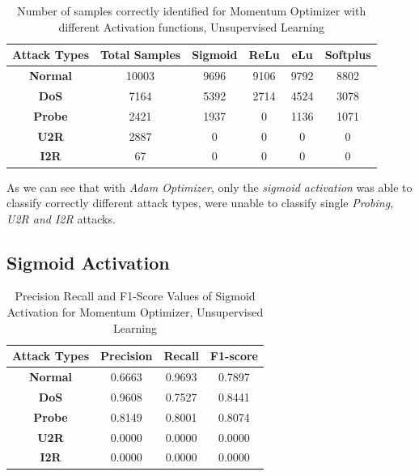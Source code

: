 \documentclass[12pt, a4paper]{report}
\begin{document}
\begin{appendices}
	\begin{table}[ht]
	\centering
	\captionsetup{justification=centering,margin=2cm}
	\begin{tabular}{|c|c|c|c|c|c|}
	\hline
	\textbf{Attack Types} & \textbf{Total Samples} & \textbf{Sigmoid} & \textbf{ReLu} & \textbf{eLu} & \textbf{Softplus} \\ \hline
	\textbf{Normal}       & 10003                  & 9696            & 9106         & 9792        & 8802           \\ \hline
	\textbf{DoS}          & 7164                  & 5392            & 2714         & 4524        & 3078             \\ \hline
	\textbf{Probe}        & 2421                  & 1937             & 0          & 1136         & 1071              \\ \hline
	\textbf{U2R}          & 2887                    & 0             & 0           & 0          & 0               \\ \hline
	\textbf{I2R}          & 67                     & 0               & 0            & 0           & 0                \\ \hline
	\end{tabular}
	\caption{Number of samples correctly identified for Momentum Optimizer with different Activation functions, Unsupervised Learning}
	\label{confusion_sgd_tf}
	\end{table}
  
  As we can see that with \textit{Adam Optimizer}, only the \textit{sigmoid activation} was able to classify correctly different attack types, were unable to classify single \textit{Probing, U2R and I2R} attacks.
   
   \subsection{Sigmoid Activation}
 	 \begin{table}[ht]
		\centering
		\captionsetup{justification=centering,margin=2cm}
		\begin{tabular}{|c|c|c|c|}
		\hline
		\textbf{Attack Types} & \textbf{Precision} & \textbf{Recall} & \textbf{F1-score} \\ \hline
		\textbf{Normal}       & 0.6663             & 0.9693          & 0.7897            \\ \hline
		\textbf{DoS}          & 0.9608             & 0.7527          & 0.8441            \\ \hline
		\textbf{Probe}        & 0.8149             & 0.8001          & 0.8074            \\ \hline
		\textbf{U2R}          & 0.0000             & 0.0000          & 0.0000            \\ \hline
		\textbf{I2R}          & 0.0000             & 0.0000          & 0.0000            \\ \hline
		\end{tabular}
		\caption{Precision Recall and F1-Score Values of Sigmoid Activation for Momentum Optimizer, Unsupervised Learning}
		\label{classification sigmoid sgd tf}
		\end{table} 
  

\end{appendices}
\end{document}

